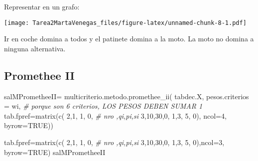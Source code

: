 \documentclass[
]{article}
\newenvironment{Shaded}{\begin{snugshade}}{\end{snugshade}}
\newcommand{\AttributeTok}[1]{\textcolor[rgb]{0.77,0.63,0.00}{#1}}
\newcommand{\CommentTok}[1]{\textcolor[rgb]{0.56,0.35,0.01}{\textit{#1}}}
\newcommand{\ConstantTok}[1]{\textcolor[rgb]{0.00,0.00,0.00}{#1}}
\newcommand{\DecValTok}[1]{\textcolor[rgb]{0.00,0.00,0.81}{#1}}
\newcommand{\FunctionTok}[1]{\textcolor[rgb]{0.00,0.00,0.00}{#1}}
\newcommand{\NormalTok}[1]{#1}
\newcommand{\OtherTok}[1]{\textcolor[rgb]{0.56,0.35,0.01}{#1}}
\newcommand{\SpecialCharTok}[1]{\textcolor[rgb]{0.00,0.00,0.00}{#1}}
\begin{document}
Representar en un grafo:

\begin{Shaded}
\end{Shaded}

\texttt{[image: Tarea2MartaVenegas\_files/figure-latex/unnamed-chunk-8-1.pdf]}

Ir en coche domina a todos y el patinete domina a la moto. La moto no
domina a ninguna alternativa.

\hypertarget{promethee-ii}{%
\subsection{Promethee II}\label{promethee-ii}}

\begin{Shaded}
\begin{Highlighting}[]
\NormalTok{salMPrometheeII}\OtherTok{=} \FunctionTok{multicriterio.metodo.promethee\_ii}\NormalTok{(}
\NormalTok{  tabdec.X,}
  \AttributeTok{pesos.criterios =}\NormalTok{ wi, }\CommentTok{\# porque son 6 criterios, LOS PESOS DEBEN SUMAR 1}
  \AttributeTok{tab.fpref=}\FunctionTok{matrix}\NormalTok{(}\FunctionTok{c}\NormalTok{( }\DecValTok{2}\NormalTok{,}\DecValTok{1}\NormalTok{, }\DecValTok{1}\NormalTok{, }\DecValTok{0}\NormalTok{, }\CommentTok{\# nro ,qi,pi,si}
                      \DecValTok{3}\NormalTok{,}\DecValTok{10}\NormalTok{,}\DecValTok{30}\NormalTok{,}\DecValTok{0}\NormalTok{,}
                      \DecValTok{1}\NormalTok{,}\DecValTok{3}\NormalTok{, }\DecValTok{5}\NormalTok{, }\DecValTok{0}\NormalTok{),}
                   \AttributeTok{ncol=}\DecValTok{4}\NormalTok{,}
                   \AttributeTok{byrow=}\ConstantTok{TRUE}\NormalTok{))}

\NormalTok{  tab.fpref}\OtherTok{=}\FunctionTok{matrix}\NormalTok{(}\FunctionTok{c}\NormalTok{( }\DecValTok{2}\NormalTok{,}\DecValTok{1}\NormalTok{, }\DecValTok{1}\NormalTok{, }\DecValTok{0}\NormalTok{, }\CommentTok{\# nro ,qi,pi,si}
                      \DecValTok{3}\NormalTok{,}\DecValTok{10}\NormalTok{,}\DecValTok{30}\NormalTok{,}\DecValTok{0}\NormalTok{,}
                      \DecValTok{1}\NormalTok{,}\DecValTok{3}\NormalTok{, }\DecValTok{5}\NormalTok{, }\DecValTok{0}\NormalTok{),}\AttributeTok{ncol=}\DecValTok{3}\NormalTok{,}
                   \AttributeTok{byrow=}\ConstantTok{TRUE}\NormalTok{)}
\NormalTok{salMPrometheeII}
\end{Highlighting}
\end{Shaded}
\end{document}
